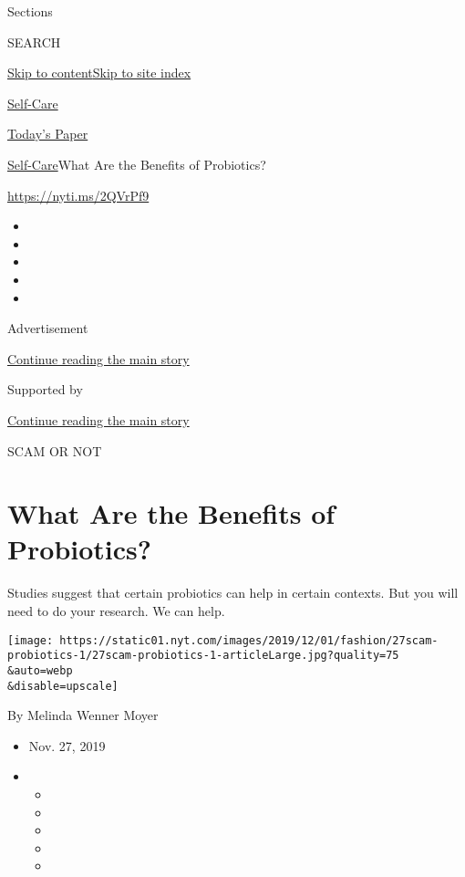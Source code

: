 Sections

SEARCH

\protect\hyperlink{site-content}{Skip to
content}\protect\hyperlink{site-index}{Skip to site index}

\href{https://www.nytimes.com/section/style/self-care/}{Self-Care}

\href{https://myaccount.nytimes.com/auth/login?response_type=cookie\&client_id=vi}{}

\href{https://www.nytimes.com/section/todayspaper}{Today's Paper}

\href{/section/style/self-care/}{Self-Care}\textbar{}What Are the
Benefits of Probiotics?

\url{https://nyti.ms/2QVrPf9}

\begin{itemize}
\item
\item
\item
\item
\item
\end{itemize}

Advertisement

\protect\hyperlink{after-top}{Continue reading the main story}

Supported by

\protect\hyperlink{after-sponsor}{Continue reading the main story}

SCAM OR NOT

\hypertarget{what-are-the-benefits-of-probiotics}{%
\section{What Are the Benefits of
Probiotics?}\label{what-are-the-benefits-of-probiotics}}

Studies suggest that certain probiotics can help in certain contexts.
But you will need to do your research. We can help.

\texttt{[image: https://static01.nyt.com/images/2019/12/01/fashion/27scam-probiotics-1/27scam-probiotics-1-articleLarge.jpg?quality=75\\\&auto=webp\\\&disable=upscale]}

By Melinda Wenner Moyer

\begin{itemize}
\item
  Nov. 27, 2019
\item
  \begin{itemize}
  \item
  \item
  \item
  \item
  \item
  \end{itemize}
\end{itemize}

